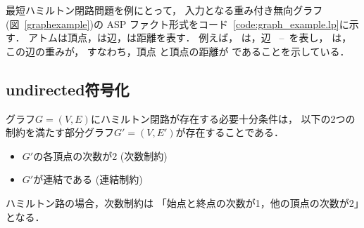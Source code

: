 

最短ハミルトン閉路問題を例にとって，
入力となる重み付き無向グラフ(図~\ref{graphexample})の
ASP ファクト形式をコード~\ref{code:graph_example.lp}に示す．
%
アトムは頂点，は辺，は距離を表す．
例えば，
は，辺
~--~を表し，
は，この辺の重みが，
すなわち，頂点 と頂点の距離が
であることを示している．

\subsection{\textsf{undirected}符号化}






グラフ$G=(V,E)$にハミルトン閉路が存在する必要十分条件は，
以下の2つの制約を満たす部分グラフ$G'=(V,E')$が存在することである．
\begin{itemize}
\item $G'$の各頂点の次数が2 (次数制約)
\item $G'$が連結である (連結制約)
\end{itemize}
ハミルトン路の場合，次数制約は
「始点と終点の次数が1，他の頂点の次数が2」となる．

